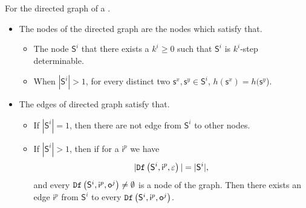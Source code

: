 \begin{definition}
For the directed graph of a \BCN.   
\begin{itemize}
\item The nodes of the directed graph are the nodes which satisfy that.
\begin{itemize}
\item  The node $\mathsf{S}^i$ that there exists a $k^{i}\ge0$ such that $\mathsf{S}^i$ is $k^{i}$-step determinable.
\item When $|\mathsf{S}^i|>1$, for every distinct two $\mathsf{s}^x, \mathsf{s}^y \in \mathsf{S}^i$, $h(\mathsf{s}^x)=h(\mathsf{s}^y$). 
 \end{itemize}

\item The edges of directed graph satisfy that.
\begin{itemize}
 \item If $|\mathsf{S}^i|=1$, then there are not edge from $\mathsf{S}^i$ to other nodes.
 \item  If $|\mathsf{S}^i|>1$, then if for a $\mathsf{i}^p$ we have \[|{\tt Df}\left(\mathsf{S}^i,\mathsf{i}^p,\varepsilon\right)|=|\mathsf{S}^i|,\] and every ${\tt Df}\left(\mathsf{S}^i,\mathsf{i}^{p},\mathsf{o}^{j}\right)\ne\emptyset$ is a node of the graph. Then there exists an edge $\mathsf{i}^p$ from $\mathsf{S}^i$ to every ${\tt Df}\left(\mathsf{S}^i,\mathsf{i}^{p},\mathsf{o}^{j}\right)$.
 
 \end{itemize}
 \end{itemize}
\end{definition}

